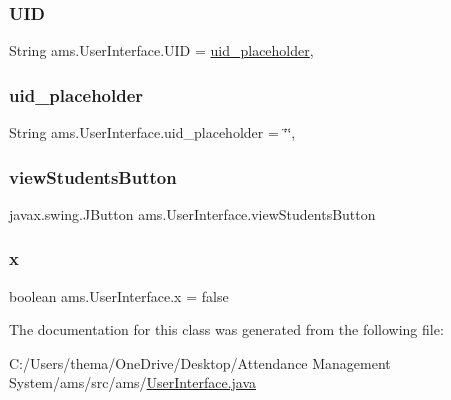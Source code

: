 \mbox{\label{classams_1_1_user_interface_a4220d2d966388244f998d042249a71fc}} 
\subsubsection{\texorpdfstring{UID}{UID}}
{\footnotesize\ttfamily String ams.\+User\+Interface.\+U\+ID = \mbox{\hyperlink{classams_1_1_user_interface_a89f889d43e99ec32651d1e735f7c8621}{uid\+\_\+placeholder}}\hspace{0.3cm}{\ttfamily [static]}, {\ttfamily [protected]}}

\mbox{\label{classams_1_1_user_interface_a89f889d43e99ec32651d1e735f7c8621}} 
\subsubsection{\texorpdfstring{uid\_placeholder}{uid\_placeholder}}
{\footnotesize\ttfamily String ams.\+User\+Interface.\+uid\+\_\+placeholder = \char`\"{}\char`\"{}\hspace{0.3cm}{\ttfamily [static]}, {\ttfamily [protected]}}

\mbox{\label{classams_1_1_user_interface_a0149f362602f1ce708e919161b3d77d2}} 
\subsubsection{\texorpdfstring{viewStudentsButton}{viewStudentsButton}}
{\footnotesize\ttfamily javax.\+swing.\+J\+Button ams.\+User\+Interface.\+view\+Students\+Button\hspace{0.3cm}{\ttfamily [static]}}

\mbox{\label{classams_1_1_user_interface_a5f205e78a8b1725a791e5f77a767f4f7}} 
\subsubsection{\texorpdfstring{x}{x}}
{\footnotesize\ttfamily boolean ams.\+User\+Interface.\+x = false\hspace{0.3cm}{\ttfamily [static]}}



The documentation for this class was generated from the following file\+:\begin{DoxyCompactItemize}
\item 
C\+:/\+Users/thema/\+One\+Drive/\+Desktop/\+Attendance Management System/ams/src/ams/\mbox{\hyperlink{_user_interface_8java}{User\+Interface.\+java}}\end{DoxyCompactItemize}
